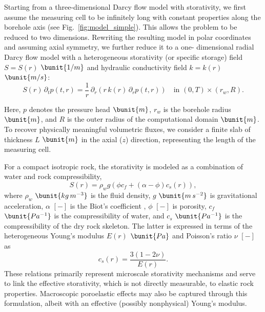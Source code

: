 Starting from a three-dimensional Darcy flow model with storativity, we first
assume the measuring cell to be infinitely long with constant properties
along the borehole axis (see Fig.~\ref{fig:model_simple}). This allows the
problem to be reduced to two dimensions. Rewriting the resulting model in polar
coordinates and assuming axial symmetry, we further reduce it to a one-
dimensional radial Darcy flow model with a heterogeneous storativity (or specific storage) field
$S = S(r)$ $\bunit{1/m}$ and hydraulic conductivity field $k = k(r)$ $\bunit{m/s}$:
\[
S(r)\,\partial_t p(t,r)
= \frac{1}{r}\,\partial_r\!\left(
r\,k(r)\,\partial_r p(t,r)
\right)
\quad \text{in } (0,T)\times(r_w,R).
\]

Here, $p$ denotes the pressure head $\bunit{m}$, $r_w$ is the borehole radius $\bunit{m}$,
and $R$ is the outer radius of the computational domain $\bunit{m}$. 
To recover physically meaningful volumetric
fluxes, we consider a finite slab of thickness $L$ $\bunit{m}$ in the axial ($z$)
direction, representing the length of the measuring cell.

For a compact isotropic rock, the storativity is modeled as a combination of
water and rock compressibility,
\[
S(r) = \rho_w g\left(\phi c_f + (\alpha - \phi)c_s(r)\right),
\]
where $\rho_w$ $\bunit{kg\,m^{-3}}$ is the fluid density, $g$ $\bunit{m\,s^{-2}}$ is
gravitational acceleration, $\alpha$ $[-]$ is the Biot's coefficient , $\phi$ $[-]$ is porosity, $c_f$ $\bunit{Pa^{-1}}$ is the
compressibility of water, and $c_s$ $\bunit{Pa^{-1}}$ is the compressibility of the
dry rock skeleton. The latter is expressed in terms of the heterogeneous
Young’s modulus $E(r)$ $\bunit{Pa}$ and Poisson’s ratio $\nu$ $[-]$ as
\[
c_s(r) = \frac{3(1-2\nu)}{E(r)}.
\]
These relations primarily represent microscale storativity mechanisms and
serve to link the effective storativity, which is not directly measurable, to
elastic rock properties. Macroscopic poroelastic effects may also be captured
through this formulation, albeit with an effective (possibly nonphysical)
Young’s modulus.

